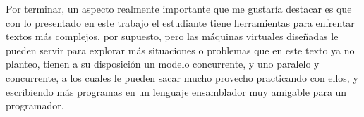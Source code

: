 \documentclass[letterpaper,12pt,oneside]{book}
\begin{document}
			
			Por terminar, un aspecto realmente importante que me gustaría destacar es que con lo presentado en este trabajo el estudiante
			tiene herramientas para enfrentar textos más complejos, por supuesto, pero las máquinas virtuales diseñadas le pueden servir
			para explorar más situaciones o problemas que en este texto ya no planteo, tienen a su disposición un modelo
			concurrente, y uno paralelo y concurrente, a los cuales le pueden sacar mucho provecho practicando con ellos, y escribiendo
			más programas en un lenguaje ensamblador muy amigable para un programador.
\newpage                                                                                                                                                                                                                                                                                                                                                                                                                                                                                                                                                                                                                                                                                                                                                                                                                                                                                                                                                                                                                                                                                                                                                                                                                                                                                                                                                                                                                                                                                                                                                                                                                                                                                                                                                                              


\backmatter

\printbibliography
\end{document}
